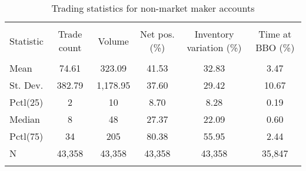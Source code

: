
\begin{table}[!htbp] \centering 
  \caption{Trading statistics for non-market maker accounts} 
  \label{} 
\begin{tabular}{@{\extracolsep{5pt}}lccccc} 
\\[-1.8ex]\hline 
\hline \\[-1.8ex] 
Statistic & Trade count & Volume & Net pos. (\%) & Inventory variation (\%) & Time at BBO (\%) \\ 
\hline \\[-1.8ex] 
Mean & 74.61 & 323.09 & 41.53 & 32.83 & 3.47 \\ 
St. Dev. & 382.79 & 1,178.95 & 37.60 & 29.42 & 10.67 \\ 
Pctl(25) & 2 & 10 & 8.70 & 8.28 & 0.19 \\ 
Median & 8 & 48 & 27.37 & 22.09 & 0.60 \\ 
Pctl(75) & 34 & 205 & 80.38 & 55.95 & 2.44 \\ 
N & 43,358 & 43,358 & 43,358 & 43,358 & 35,847 \\ 
\hline \\[-1.8ex] 
\end{tabular} 
\end{table} 
